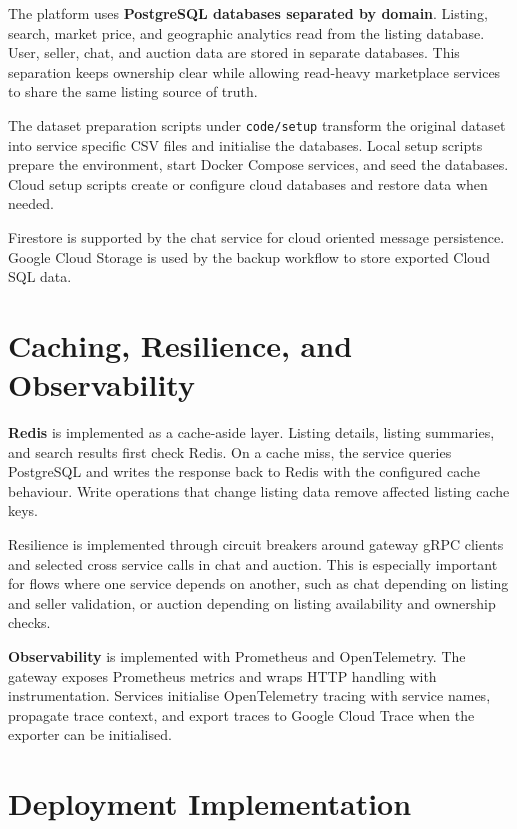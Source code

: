 The platform uses \textbf{PostgreSQL databases separated by domain}. Listing, search, market price, and geographic analytics read from the listing database. User, seller, chat, and auction data are stored in separate databases. This separation keeps ownership clear while allowing read-heavy marketplace services to share the same listing source of truth.

The dataset preparation scripts under \texttt{code/setup} transform the original dataset into service specific CSV files and initialise the databases. Local setup scripts prepare the environment, start Docker Compose services, and seed the databases. Cloud setup scripts create or configure cloud databases and restore data when needed.

Firestore is supported by the chat service for cloud oriented message persistence. Google Cloud Storage is used by the backup workflow to store exported Cloud SQL data.

\section{Caching, Resilience, and Observability}

\textbf{Redis} is implemented as a cache-aside layer. Listing details, listing summaries, and search results first check Redis. On a cache miss, the service queries PostgreSQL and writes the response back to Redis with the configured cache behaviour. Write operations that change listing data remove affected listing cache keys.

Resilience is implemented through circuit breakers around gateway gRPC clients and selected cross service calls in chat and auction. This is especially important for flows where one service depends on another, such as chat depending on listing and seller validation, or auction depending on listing availability and ownership checks.

\textbf{Observability} is implemented with Prometheus and OpenTelemetry. The gateway exposes Prometheus metrics and wraps HTTP handling with instrumentation. Services initialise OpenTelemetry tracing with service names, propagate trace context, and export traces to Google Cloud Trace when the exporter can be initialised.

\newpage

\section{Deployment Implementation}

